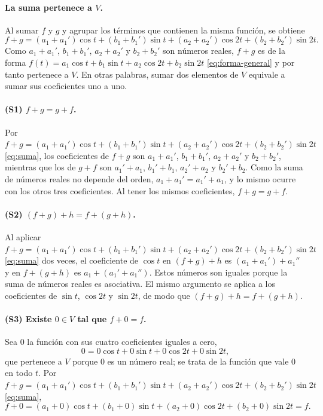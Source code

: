 \paragraph{La suma pertenece a $V$.}
Al sumar $f$ y $g$ y agrupar los términos que contienen la misma función, se obtiene
\begin{equation}\label{eq:suma}
  f+g = (a_1+a_1')\cos t + (b_1+b_1')\sin t + (a_2+a_2')\cos 2t + (b_2+b_2')\sin 2t.
\end{equation}
Como $a_1+a_1'$, $b_1+b_1'$, $a_2+a_2'$ y $b_2+b_2'$ son números reales, $f+g$ es de la
forma $f(t)=a_1\cos t+b_1\sin t+a_2\cos 2t+b_2\sin 2t$ \eqref{eq:forma-general} y por tanto pertenece a $V$. En otras palabras, sumar dos
elementos de $V$ equivale a sumar sus coeficientes uno a uno.

\paragraph{(S1) $f+g = g+f$.}
Por $f+g=(a_1+a_1')\cos t+(b_1+b_1')\sin t+(a_2+a_2')\cos 2t+(b_2+b_2')\sin 2t$ \eqref{eq:suma}, los coeficientes de $f+g$ son $a_1+a_1'$, $b_1+b_1'$, $a_2+a_2'$ y
$b_2+b_2'$, mientras que los de $g+f$ son $a_1'+a_1$, $b_1'+b_1$, $a_2'+a_2$ y $b_2'+b_2$. Como
la suma de números reales no depende del orden, $a_1+a_1'=a_1'+a_1$, y lo mismo ocurre con los
otros tres coeficientes. Al tener los mismos coeficientes, $f+g=g+f$.

\paragraph{(S2) $(f+g)+h = f+(g+h)$.}
Al aplicar $f+g=(a_1+a_1')\cos t+(b_1+b_1')\sin t+(a_2+a_2')\cos 2t+(b_2+b_2')\sin 2t$ \eqref{eq:suma} dos veces, el coeficiente de $\cos t$ en $(f+g)+h$ es
$(a_1+a_1')+a_1''$ y en $f+(g+h)$ es $a_1+(a_1'+a_1'')$. Estos números son iguales porque la
suma de números reales es asociativa. El mismo argumento se aplica a los coeficientes de
$\sin t$, $\cos 2t$ y $\sin 2t$, de modo que $(f+g)+h = f+(g+h)$.

\paragraph{(S3) Existe $0\in V$ tal que $f+0 = f$.}
Sea $0$ la función con sus cuatro coeficientes iguales a cero,
\[
  0 = 0\cos t + 0\sin t + 0\cos 2t + 0\sin 2t,
\]
que pertenece a $V$ porque $0$ es un número real; se trata de la función que vale $0$ en todo
$t$. Por $f+g=(a_1+a_1')\cos t+(b_1+b_1')\sin t+(a_2+a_2')\cos 2t+(b_2+b_2')\sin 2t$ \eqref{eq:suma},
\[
  f+0 = (a_1+0)\cos t + (b_1+0)\sin t + (a_2+0)\cos 2t + (b_2+0)\sin 2t = f.
\]

